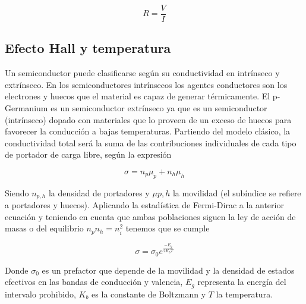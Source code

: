 \begin{equation}
	R = \frac{V}{I}
\end{equation}

\subsection{Efecto Hall y temperatura}

Un semiconductor puede clasificarse según su conductividad en intrínseco y extrínseco. En los semiconductores intrínsecos los agentes conductores son los electrones y huecos que el material es capaz de generar térmicamente. El p-Germanium es un semiconductor extrínseco ya que es un semiconductor (intrínseco) dopado con materiales que lo proveen de un exceso de huecos para favorecer la conducción a bajas temperaturas. Partiendo del modelo clásico, la conductividad total será la suma de las contribuciones individuales de cada tipo de portador de carga libre, según la expresión

\begin{equation}
	\sigma = n_p \mu_p + n_h \mu_h
\end{equation}

Siendo $n_{p,h}$ la densidad de portadores y $\mu{p,h}$ la movilidad (el subíndice se refiere a portadores y huecos). Aplicando la estadística de Fermi-Dirac a la anterior ecuación y teniendo en cuenta que ambas poblaciones siguen la ley de acción de masas o del equilibrio $n_p n_h = n_i^{2}$ tenemos que se cumple

\begin{equation}
	\sigma = \sigma_0 e^{\frac{-E_g}{2K_bT}}
\end{equation}

Donde $\sigma_0$ es un prefactor que depende de la movilidad y la densidad de estados efectivos en las bandas de conducción y valencia, $E_g$ representa la energía del intervalo prohibido, $K_b$ es la constante de Boltzmann y $T$ la temperatura.